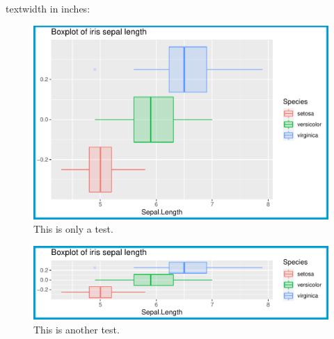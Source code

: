 \documentclass[letterpaper, 12pt]{article}
\begin{document}
textwidth in inches: \prntlen{\textwidth}

\begin{figure}[h!]
\caption{This is only a test.}
\includegraphics{test_1.pdf}
\end{figure}

\begin{figure}[h!]
\caption{This is another test.}
\includegraphics{test_2.pdf}
\end{figure}
\end{document}
